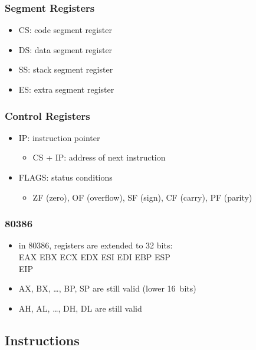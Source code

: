 \documentclass[dvipsnames]{beamer}
\begin{document}
\begin{frame}
  \frametitle{Segment Registers}

  \begin{itemize}
    \item CS: code segment register
    \item DS: data segment register
    \item SS: stack segment register
    \item ES: extra segment register
  \end{itemize}
\end{frame}

\begin{frame}
  \frametitle{Control Registers}

  \begin{itemize}
    \item IP: instruction pointer
    \begin{itemize}
      \item CS + IP: address of next instruction
    \end{itemize}

    \medskip
    \item FLAGS: status conditions
    \begin{itemize}
      \item ZF (zero), OF (overflow), SF (sign), CF (carry), PF (parity)
    \end{itemize}
  \end{itemize}
\end{frame}

\begin{frame}
  \frametitle{80386}

  \begin{itemize}
    \item in 80386, registers are extended to 32 bits:\\
      EAX EBX ECX EDX ESI EDI EBP ESP\\
      EIP

    \medskip
    \item AX, BX, \ldots, BP, SP are still valid (lower 16~bits)
    \item AH, AL, \ldots, DH, DL are still valid
  \end{itemize}
\end{frame}

\subsection{Instructions}
\end{document}
